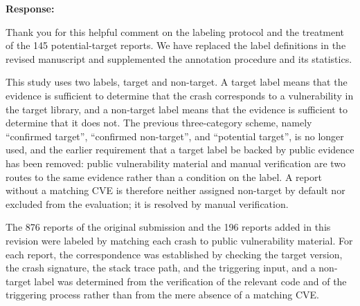\documentclass[onecolumn,11pt]{article}
\newcommand{\secr}[2]{\par\mySep \noindent \textsf{\textbf{#1 }}{#2}\par}
\newcommand{\mySep}{\vspace{8pt}}
\begin{document}
\secr{Response:}{Thank you for this helpful comment on the labeling protocol and the treatment of the 145 potential-target reports. We have replaced the label definitions in the revised manuscript and supplemented the annotation procedure and its statistics.

This study uses two labels, target and non-target. A target label means that the evidence is sufficient to determine that the crash corresponds to a vulnerability in the target library, and a non-target label means that the evidence is sufficient to determine that it does not. The previous three-category scheme, namely ``confirmed target'', ``confirmed non-target'', and ``potential target'', is no longer used, and the earlier requirement that a target label be backed by public evidence has been removed: public vulnerability material and manual verification are two routes to the same evidence rather than a condition on the label. A report without a matching CVE is therefore neither assigned non-target by default nor excluded from the evaluation; it is resolved by manual verification.

The 876 reports of the original submission and the 196 reports added in this revision were labeled by matching each crash to public vulnerability material. For each report, the correspondence was established by checking the target version, the crash signature, the stack trace path, and the triggering input, and a non-target label was determined from the verification of the relevant code and of the triggering process rather than from the mere absence of a matching CVE.

}
\end{document}

